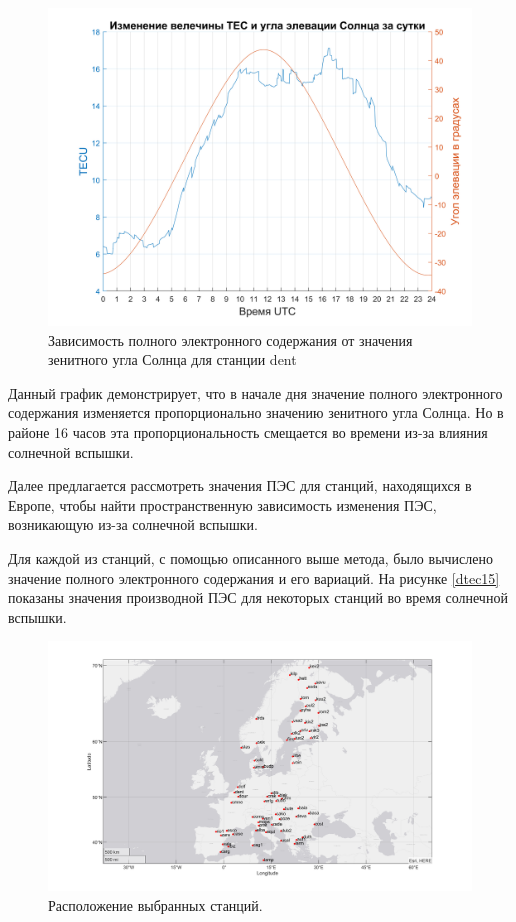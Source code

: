 \documentclass[a4paper]{article}
\begin{document}
\begin{figure}[h]
\centering
\includegraphics[width = 1\linewidth]{pics/clean_pics/tec_sun.png}
\caption{Зависимость полного электронного содержания от значения зенитного угла Солнца для станции dent}
\label{tecsun}
\end{figure} 

Данный график демонстрирует, что в начале дня значение полного электронного содержания изменяется пропорционально значению зенитного угла Солнца. Но в районе 16 часов эта пропорциональность смещается во времени из-за влияния солнечной вспышки. 

Далее предлагается рассмотреть значения ПЭС для станций, находящихся в Европе, чтобы найти пространственную зависимость изменения ПЭС, возникающую из-за солнечной вспышки. 

Для каждой из станций, с помощью описанного выше метода, было вычислено значение полного электронного содержания и его вариаций. На рисунке \ref{dtec15} показаны значения производной ПЭС для некоторых станций во время солнечной вспышки.

\begin{landscape}
\begin{figure}[h!]
\centering
\includegraphics[width = 1\linewidth]{pics/clean_pics/stations.png}
\caption{Расположение выбранных станций.}
\end{figure}
\end{landscape}
\end{document}
